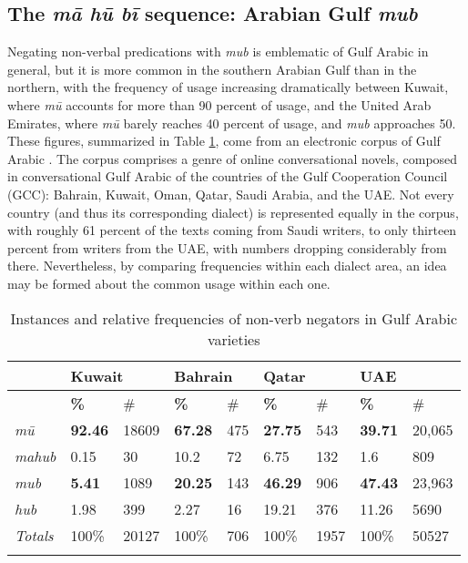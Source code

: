 \documentclass[output=paper]{langsci/langscibook}
\begin{document}
\subsection{The \textit{mā hū bī} sequence: Arabian Gulf \textit{mub}} \label{s:WiAR-4.5}

Negating non-verbal predications with \textit{mub} is emblematic of Gulf Arabic in general, but it is more common in the southern Arabian Gulf than in the northern, with the frequency of usage increasing dramatically between Kuwait, where \textit{mū} accounts for more than 90 percent of usage, and the United Arab Emirates, where \textit{mū} barely reaches 40 percent of usage, and \textit{mub} approaches 50. These figures, summarized in Table \ref{tab:WiAR-3}, come from an electronic corpus of Gulf Arabic \citep{khalifa2016a}. The corpus comprises a genre of online conversational novels, composed in conversational Gulf Arabic of the countries of the Gulf Cooperation Council (GCC): Bahrain, Kuwait, Oman, Qatar, Saudi Arabia, and the UAE. Not every country (and thus its corresponding dialect) is represented equally in the corpus, with roughly 61 percent of the texts coming from Saudi writers, to only thirteen percent from writers from the UAE, with numbers dropping considerably from there. Nevertheless, by comparing frequencies within each dialect area, an idea may be formed about the common usage within each one.

\begin{table}[!h]
	\centering
	\caption{Instances and relative frequencies of non-verb negators in Gulf Arabic varieties}
	\label{tab:WiAR-3}
\begin{tabular}{@{}lllllllll@{}}
\lsptoprule
\textit{} & \multicolumn{2}{l}{Kuwait} & \multicolumn{2}{l}{Bahrain} & \multicolumn{2}{l}{Qatar} & \multicolumn{2}{l}{UAE} \\ \midrule
\textit{} & \textbf{\%} & \# & \textbf{\%} & \# & \textbf{\%} & \# & \textbf{\%} & \# \\ \midrule
\textit{mū} & \textbf{92.46} & 18609 & \textbf{67.28} & 475 & \textbf{27.75} & 543 & \textbf{39.71} & 20,065 \\
\textit{mahub} & 0.15 & 30 & 10.2 & 72 & 6.75 & 132 & 1.6 & 809 \\
\textit{mub} & \textbf{5.41} & 1089 & \textbf{20.25} & 143 & \textbf{46.29} & 906 & \textbf{47.43} & 23,963 \\
\textit{hub} & 1.98 & 399 & 2.27 & 16 & 19.21 & 376 & 11.26 & 5690 \\ \midrule
\textit{Totals} & 100\% & 20127 & 100\% & 706 & 100\% & 1957 & 100\% & 50527 \\ \lspbottomrule   
\end{tabular}
\end{table}
\end{document}
